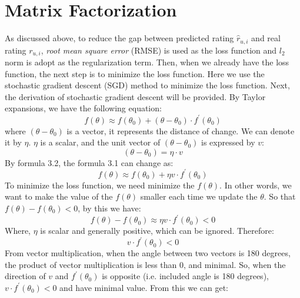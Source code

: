 \section{Matrix Factorization}
As discussed above, to reduce the gap between predicted rating $\hat{r}_{u,i}$ and real rating $r_{u,i}$, \textit{root mean square error} (RMSE) is used as the loss function and $\mathit{l}_{2}$ norm is adopt as the regularization term. Then, when we already have the loss function, the next step is to minimize the loss function. Here we use the stochastic gradient descent (SGD) method to minimize the loss function. Next, the derivation of stochastic gradient descent will be provided. By Taylor expansions, we have the following equation:
\begin{equation}
    f(\theta) \approx f\left(\theta_{0}\right)+\left(\theta-\theta_{0}\right) \cdot f^{\prime}\left(\theta_{0}\right)
\end{equation}
where $\left(\theta-\theta_{0}\right)$ is a vector, it represents the distance of change. We can denote it by $\eta $. $\eta $ is a scalar, and the unit vector of $\left(\theta-\theta_{0}\right)$ is expressed by $v$:
\begin{equation}
    \left(\theta-\theta_{0}\right) = \eta \cdot v
\end{equation}
By formula 3.2, the formula 3.1 can change as:
\begin{equation}
        f(\theta) \approx f\left(\theta_{0}\right)+\eta v \cdot f^{\prime}\left(\theta_{0}\right)
\end{equation}
To minimize the loss function, we need minimize the $f(\theta)$. In other words, we want to make the value of the $f(\theta)$ smaller each time we update the $\theta$. So that $f(\theta)-f\left(\theta_{0}\right)< 0$, by this we have:
\begin{equation}
    f(\theta)-f\left(\theta_{0}\right) \approx \eta v \cdot f^{\prime}\left(\theta_{0}\right) < 0
\end{equation}
Where, $\eta $ is scalar and generally positive, which can be ignored. Therefore:
\begin{equation}
    v \cdot f^{\prime}\left(\theta_{0}\right) < 0
\end{equation}
From vector multiplication, when the angle between two vectors is 180 degrees, the product of vector multiplication is less than 0, and minimal. So, when the direction of $v$ and $f^{\prime}\left(\theta_{0}\right)$ is opposite (i.e. included angle is 180 degrees), $v \cdot f^{\prime}\left(\theta_{0}\right) < 0$ and have minimal value. From this we can get: 
